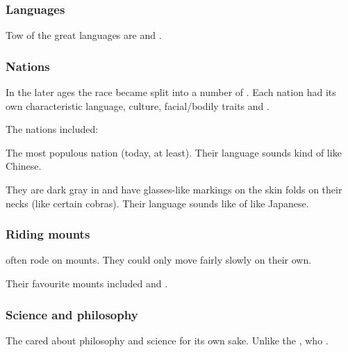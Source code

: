 \subsubsection{Languages}
Tow of the great \caisith languages are  and . 





\subsubsection{Nations}
In the later ages the \quiljaaran{} race became split into a number of . 
Each nation had its own characteristic language, culture, facial/bodily traits and \colours. 

The nations included:
\begin{gloss}

  \gitem{\KyanHweDin:} 
  The most populous nation (today, at least). 
  Their language sounds kind of like Chinese. 
  
  \gitem{\Okiriru:}
  They are dark gray in \colour and have glasses-like markings on the skin folds on their necks (like certain cobras). 
  Their language sounds like of like Japanese. 
\end{gloss}





\subsubsection{Riding mounts}
\Ophidians often rode on mounts. 
They could only move fairly slowly on their own. 

Their favourite mounts included \mezolisks and \lindworms. 





\subsubsection{Science and philosophy}
The \quiljaaran{} cared about philosophy and science for its own sake. 
Unlike the \aryothim, who . 


